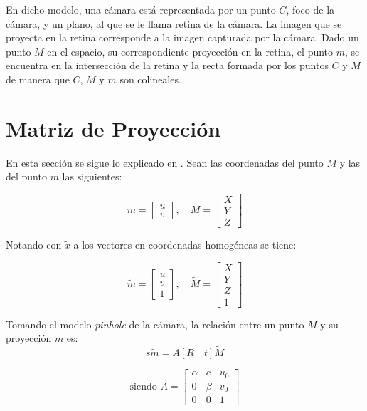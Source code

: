En dicho modelo, una cámara está representada por un punto $C$, foco de la cámara, y un plano, al  que se le llama retina de la cámara. La imagen que se proyecta en la retina corresponde a la imagen capturada por la cámara. Dado un punto $M$ en el espacio, su correspondiente proyección en la retina, el punto $m$, se encuentra en la intersección de la retina y la recta formada por los puntos $C$ y $M$ de manera que $C$, $M$ y $m$ son colineales. 

\section{Matriz de Proyección}
\label{matriz_de_proyeccion}

En esta sección se sigue lo explicado en \cite{zhang_libro}. Sean las coordenadas del punto  $M$ y las del punto $m$ las siguientes:


\[m = \begin{bmatrix}
u \\ 
v
\end{bmatrix} , \quad
M = \begin{bmatrix}
X \\ 
Y \\
Z
\end{bmatrix} \]

Notando con $\tilde{x}$ a los vectores en coordenadas homogéneas se tiene:


\[\tilde{m} = \begin{bmatrix}
u \\ 
v \\
1
\end{bmatrix} , \quad
\tilde{M} = \begin{bmatrix}
X \\ 
Y \\
Z \\
1
\end{bmatrix} \]

Tomando el modelo \textit{pinhole} de la cámara, la relación entre un punto $M$ y su proyección $m$ es:
\begin{equation}
s\tilde{m} = A [R \quad t]\tilde{M}
\label{proyeccion}
\end{equation}


\begin{equation}
\text{siendo }
A = \begin{bmatrix}
\alpha & c & u_0 \\ 
0 & \beta & v_0 \\ 
0 & 0 & 1
\end{bmatrix} 
\end{equation}

